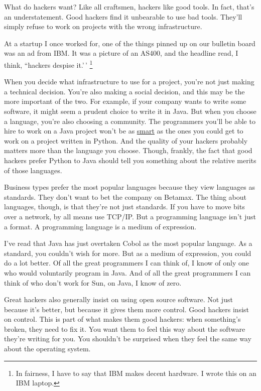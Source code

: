 What do hackers want? Like all craftsmen, hackers like good tools. In
fact, that's an understatement. Good hackers find it unbearable to use
bad tools. They'll simply refuse to work on projects with the wrong
infrastructure.

At a startup I once worked for, one of the things pinned up on our
bulletin board was an ad from IBM. It was a picture of an AS400, and the
headline read, I think, ``hackers despise it.'\,' \footnote{In fairness, I have to say that IBM makes decent hardware. I
wrote this on an IBM laptop.}

When you decide what infrastructure to use for a project, you're not
just making a technical decision. You're also making a social decision,
and this may be the more important of the two. For example, if your
company wants to write some software, it might seem a prudent choice to
write it in Java. But when you choose a language, you're also choosing a
community. The programmers you'll be able to hire to work on a Java
project won't be as \href{pypar.html}{smart} as the ones you could get
to work on a project written in Python. And the quality of your hackers
probably matters more than the language you choose. Though, frankly, the
fact that good hackers prefer Python to Java should tell you something
about the relative merits of those languages.

Business types prefer the most popular languages because they view
languages as standards. They don't want to bet the company on Betamax.
The thing about languages, though, is that they're not just standards.
If you have to move bits over a network, by all means use TCP/IP. But a
programming language isn't just a format. A programming language is a
medium of expression.

I've read that Java has just overtaken Cobol as the most popular
language. As a standard, you couldn't wish for more. But as a medium of
expression, you could do a lot better. Of all the great programmers I
can think of, I know of only one who would voluntarily program in Java.
And of all the great programmers I can think of who don't work for Sun,
on Java, I know of zero.

Great hackers also generally insist on using open source software. Not
just because it's better, but because it gives them more control. Good
hackers insist on control. This is part of what makes them good hackers:
when something's broken, they need to fix it. You want them to feel this
way about the software they're writing for you. You shouldn't be
surprised when they feel the same way about the operating system.

